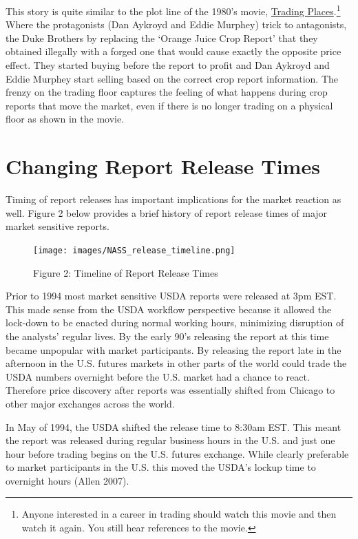 \documentclass[
  letterpaper,
  DIV=11,
  numbers=noendperiod]{scrreprt}
\begin{document}
This story is quite similar to the plot line of the 1980's movie,
\href{http://www.imdb.com/title/tt0086465/}{Trading Places}.\footnote{Anyone
  interested in a career in trading should watch this movie and then
  watch it again. You still hear references to the movie.} Where the
protagonists (Dan Aykroyd and Eddie Murphey) trick to antagonists, the
Duke Brothers by replacing the `Orange Juice Crop Report' that they
obtained illegally with a forged one that would cause exactly the
opposite price effect. They started buying before the report to profit
and Dan Aykroyd and Eddie Murphey start selling based on the correct
crop report information. The frenzy on the trading floor captures the
feeling of what happens during crop reports that move the market, even
if there is no longer trading on a physical floor as shown in the movie.

\hypertarget{changing-report-release-times-1}{%
\section{Changing Report Release
Times}\label{changing-report-release-times-1}}

Timing of report releases has important implications for the market
reaction as well. Figure 2 below provides a brief history of report
release times of major market sensitive reports.

\begin{figure}

{\centering \texttt{[image: images/NASS\_release\_timeline.png]}

}

\caption{Figure 2: Timeline of Report Release Times}

\end{figure}

Prior to 1994 most market sensitive USDA reports were released at 3pm
EST. This made sense from the USDA workflow perspective because it
allowed the lock-down to be enacted during normal working hours,
minimizing disruption of the analysts' regular lives. By the early 90's
releasing the report at this time became unpopular with market
participants. By releasing the report late in the afternoon in the U.S.
futures markets in other parts of the world could trade the USDA numbers
overnight before the U.S. market had a chance to react. Therefore price
discovery after reports was essentially shifted from Chicago to other
major exchanges across the world.

In May of 1994, the USDA shifted the release time to 8:30am EST. This
meant the report was released during regular business hours in the U.S.
and just one hour before trading begins on the U.S. futures exchange.
While clearly preferable to market participants in the U.S. this moved
the USDA's lockup time to overnight hours (Allen 2007).
\end{document}
